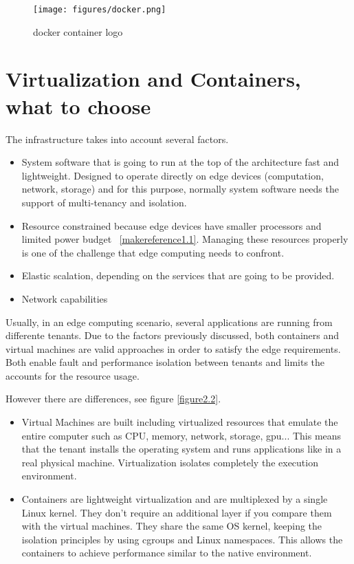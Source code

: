 \begin{figure}[h!]%
    \centering
    \texttt{[image: figures/docker.png]}
~\caption{docker container logo}
\label{figure2.1}
\end{figure}

\section{Virtualization and Containers, what to choose}
\label{makereference2.2}

The infrastructure takes into account several factors.

\begin{itemize}
    \item System software that is going to run at the top of the architecture fast and lightweight. Designed to operate directly on edge devices (computation, network, storage) and for this purpose, normally system software needs the support of multi-tenancy and isolation.
    \item Resource constrained because edge devices have smaller processors and limited power budget ~\ref{makereference1.1}. Managing these resources properly is one of the challenge that edge computing needs to confront.
    \item Elastic scalation, depending on the services that are going to be provided.
    \item Network capabilities
\end{itemize}
Usually, in an edge computing scenario, several applications are running from differente tenants. Due to the factors previously discussed, both containers and virtual machines are valid approaches in order to satisfy the edge requirements.~\cite{CORR:chong:2018} Both enable fault and performance isolation between tenants and limits the accounts for the resource usage.
\newpage

However there are differences, see figure \ref{figure2.2}.

\begin{itemize}
  \item Virtual Machines are built including virtualized resources that emulate the entire computer such as  CPU, memory, network, storage, gpu... This means that the tenant installs the operating system and runs applications like in a real physical machine. Virtualization isolates completely the execution environment.
  \item Containers are lightweight virtualization and are multiplexed by a single Linux kernel. They don't require an additional layer if you compare them with the virtual machines. They share the same OS kernel, keeping the isolation principles by using cgroups and Linux namespaces. This allows the containers to achieve performance similar to the native environment.
\end{itemize}

